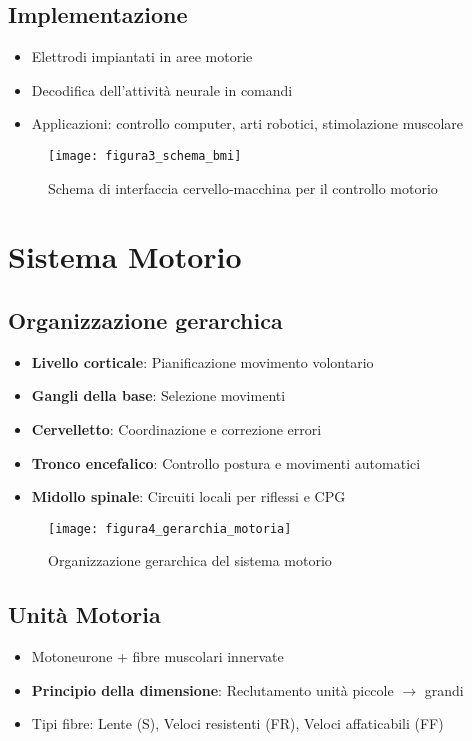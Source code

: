 \documentclass{article}
\begin{document}
\subsection{Implementazione}
\begin{itemize}
    \item Elettrodi impiantati in aree motorie
    \item Decodifica dell'attività neurale in comandi
    \item Applicazioni: controllo computer, arti robotici, stimolazione muscolare
\end{itemize}

\begin{figure}[h]
    \centering
    \texttt{[image: figura3\_schema\_bmi]}
    \caption{Schema di interfaccia cervello-macchina per il controllo motorio}
    \label{fig:bmi_schema}
\end{figure}

\section{Sistema Motorio}
\subsection{Organizzazione gerarchica}
\begin{itemize}
    \item \textbf{Livello corticale}: Pianificazione movimento volontario
    \item \textbf{Gangli della base}: Selezione movimenti
    \item \textbf{Cervelletto}: Coordinazione e correzione errori
    \item \textbf{Tronco encefalico}: Controllo postura e movimenti automatici
    \item \textbf{Midollo spinale}: Circuiti locali per riflessi e CPG
\end{itemize}

\begin{figure}[h]
    \centering
    \texttt{[image: figura4\_gerarchia\_motoria]}
    \caption{Organizzazione gerarchica del sistema motorio}
    \label{fig:gerarchia_motoria}
\end{figure}

\subsection{Unità Motoria}
\begin{itemize}
    \item Motoneurone + fibre muscolari innervate
    \item \textbf{Principio della dimensione}: Reclutamento unità piccole $\rightarrow$ grandi
    \item Tipi fibre: Lente (S), Veloci resistenti (FR), Veloci affaticabili (FF)
\end{itemize}
\end{document}
